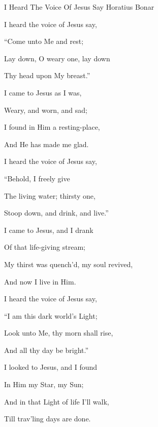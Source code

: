 \documentclass[12pt]{book}
\begin{document}
\begin{song}{I Heard The Voice Of Jesus Say}{}
  {\SBPubDom}
  {Horatius Bonar}
  {}
  {}

  \begin{SBVerse}
    I heard the voice of Jesus say,

    ``Come unto Me and rest;

    Lay down, O weary one, lay down

    Thy head upon My breast.''

    I came to Jesus as I was,

    Weary, and worn, and sad;

    I found in Him a resting-place,

    And He has made me glad.
  \end{SBVerse}

  \begin{SBVerse}
    I heard the voice of Jesus say,

    ``Behold, I freely give

    The living water; thirsty one,

    Stoop down, and drink, and live.''

    I came to Jesus, and I drank

    Of that life-giving stream;

    My thirst was quench'd, my soul revived,

    And now I live in Him.
  \end{SBVerse}

  \begin{SBVerse}
    I heard the voice of Jesus say,

    ``I am this dark world's Light;

    Look unto Me, thy morn shall rise,

    And all thy day be bright.''

    I looked to Jesus, and I found

    In Him my Star, my Sun;

    And in that Light of life I'll walk,

    Till trav'ling days are done.
  \end{SBVerse}
\end{song}
\end{document}
